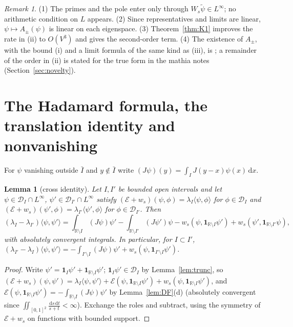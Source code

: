 \documentclass[11pt]{amsart}
\newcommand{\R}{\mathbb{R}}
\newcommand{\cE}{\mathcal{E}}
\newcommand{\one}{\mathbf{1}}
\newcommand{\dd}{\,\mathrm{d}}
\newtheorem{lemma}[theorem]{Lemma}
\theoremstyle{definition}
\theoremstyle{remark}
\newtheorem{remark}[theorem]{Remark}
\numberwithin{equation}{section}
\begin{document}
\begin{remark}\label{rem:E}
(1) The primes and the pole enter only through $W_s\tilde\psi\in L^\infty$; no arithmetic condition on $L$ appears. (2) Since representatives and limits are linear, $\psi\mapsto A_\pm(\psi)$ is linear on each eigenspace. (3) Theorem~\ref{thm:K1} improves the rate in (ii) to $O(V^3)$ and gives the second-order term. (4) The existence of $A_\pm$, with the bound (i) and a limit formula of the same kind as (iii), is \cite[(3.8), \S3.3, (3.19)]{BT26}; a remainder of the order in (ii) is stated for the true form in the mathia notes~\cite{PL329,PL336,PL337} (Section~\ref{sec:novelty}).
\end{remark}

\section{The Hadamard formula, the translation identity and nonvanishing}\label{sec:H}

For $\psi$ vanishing outside $\bar I$ and $y\notin\bar I$ write $(J\psi)(y)=\int_IJ(y-x)\psi(x)\dd x$.

\begin{lemma}[cross identity]\label{lem:cross}
Let $I,I'$ be bounded open intervals and let $\psi\in \mathcal D_I\cap L^\infty$, $\psi'\in \mathcal D_{I'}\cap L^\infty$ satisfy $(\cE+w_s)(\psi,\phi)=\lambda_I\langle\psi,\phi\rangle$ for $\phi\in \mathcal D_I$ and $(\cE+w_s)(\psi',\phi)=\lambda_{I'}\langle\psi',\phi\rangle$ for $\phi\in \mathcal D_{I'}$. Then
\[
(\lambda_I-\lambda_{I'})\langle\psi,\psi'\rangle=\int_{\R\setminus I}(J\psi)\psi'-\int_{\R\setminus I'}(J\psi')\psi-w_s(\psi,\one_{\R\setminus I}\psi')+w_s(\psi',\one_{\R\setminus I'}\psi),
\]
with absolutely convergent integrals. In particular, for $I\subset I'$,
$(\lambda_{I'}-\lambda_I)\langle\psi,\psi'\rangle=-\int_{I'\setminus I}(J\psi)\psi'+w_s(\psi,\one_{I'\setminus I}\psi')$.
\end{lemma}

\begin{proof}
Write $\psi'=\one_I\psi'+\one_{\R\setminus I}\psi'$; $\one_I\psi'\in \mathcal D_I$ by Lemma~\ref{lem:trunc}, so $(\cE+w_s)(\psi,\psi')=\lambda_I\langle\psi,\psi'\rangle+\cE(\psi,\one_{\R\setminus I}\psi')+w_s(\psi,\one_{\R\setminus I}\psi')$, and $\cE(\psi,\one_{\R\setminus I}\psi')=-\int_{\R\setminus I}(J\psi)\psi'$ by Lemma~\ref{lem:DF}(d) (absolutely convergent since $\iint_{[0,1]^2}\frac{\dd s\dd t}{s+t}<\infty$). Exchange the roles and subtract, using the symmetry of $\cE+w_s$ on functions with bounded support.
\end{proof}
\end{document}
